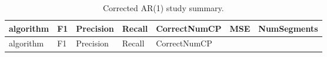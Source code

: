 \documentclass[
  10pt,
]{article}
\begin{document}
\begin{longtable}[]{@{}
  >{\raggedright\arraybackslash}p{}
  >{\raggedleft\arraybackslash}p{}
  >{\raggedleft\arraybackslash}p{}
  >{\raggedleft\arraybackslash}p{}
  >{\raggedleft\arraybackslash}p{}
  >{\raggedleft\arraybackslash}p{}
  >{\raggedleft\arraybackslash}p{}@{}}
\caption{Corrected AR(1) study summary.}\tabularnewline
\toprule\noalign{}
\begin{minipage}[b]{\linewidth}\raggedright
algorithm
\end{minipage} & \begin{minipage}[b]{\linewidth}\raggedleft
F1
\end{minipage} & \begin{minipage}[b]{\linewidth}\raggedleft
Precision
\end{minipage} & \begin{minipage}[b]{\linewidth}\raggedleft
Recall
\end{minipage} & \begin{minipage}[b]{\linewidth}\raggedleft
CorrectNumCP
\end{minipage} & \begin{minipage}[b]{\linewidth}\raggedleft
MSE
\end{minipage} & \begin{minipage}[b]{\linewidth}\raggedleft
NumSegments
\end{minipage} \\
\midrule\noalign{}
\endfirsthead
\toprule\noalign{}
\begin{minipage}[b]{\linewidth}\raggedright
algorithm
\end{minipage} & \begin{minipage}[b]{\linewidth}\raggedleft
F1
\end{minipage} & \begin{minipage}[b]{\linewidth}\raggedleft
Precision
\end{minipage} & \begin{minipage}[b]{\linewidth}\raggedleft
Recall
\end{minipage} & \begin{minipage}[b]{\linewidth}\raggedleft
CorrectNumCP
\end{minipage} & \begin{minipage}[b]{\linewidth}\raggedleft

\end{minipage}
\end{longtable}
\end{document}
